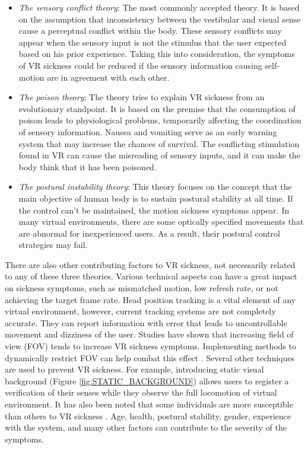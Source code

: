 \begin{itemize}
\item \textit{The sensory conflict theory}: The most commonly accepted theory. It is based on the assumption that inconsistency between the vestibular and visual sense cause a perceptual conflict within the body. These sensory conflicts may appear when the sensory input is not the stimulus that the user expected based on his prior experience. Taking this into consideration, the symptoms of VR sickness could be reduced if the sensory information causing self-motion are in agreement with each other.
\item \textit{The poison theory}: The theory tries to explain VR sickness from an evolutionary standpoint. It is based on the premise that the consumption of poison leads to physiological problems, temporarily affecting the coordination of sensory information. Nausea and vomiting serve as an early warning system that may increase the chances of survival. The conflicting stimulation found in VR can cause the misreading of sensory inputs, and it can make the body think that it has been poisoned.
\item \textit{The postural instability theory}: This theory focuses on the concept that the main objective of human body is to sustain postural stability at all time. If the control can't be maintained, the motion sickness symptoms appear. In many virtual environments, there are some optically specified movements that are abnormal for inexperienced users. As a result, their postural control strategies may fail.
\end{itemize}

There are also other contributing factors to VR sickness, not necessarily related to any of these three theories. Various technical aspects can have a great impact on sickness symptoms, such as mismatched motion, low refresh rate, or not achieving the target frame rate. Head position tracking is a vital element of any virtual environment, however, current tracking systems are not completely accurate. They can report information with error that leads to uncontrollable movement and dizziness of the user. Studies have shown that increasing field of view (FOV) tends to increase VR sickness symptoms. Implementing methods to dynamically restrict FOV can help combat this effect \cite{DYNAMICFOD}. Several other techniques are used to prevent VR sickness. For example, introducing static visual background (Figure \ref{fig:STATIC_BACKGROUND}) allows users to register a verification of their senses while they observe the full locomotion of virtual environment. It has also been noted that some individuals are more susceptible than others to VR sickness \cite{VRINDIVIDUALS}. Age, health, postural stability, gender, experience with the system, and many other factors can contribute to the severity of the symptoms.

